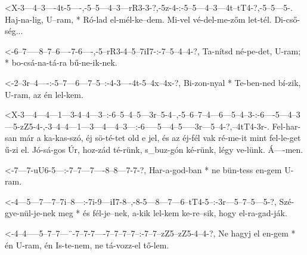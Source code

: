   {<X-3---4--3----4t-5----,-5--5---4--3---rR3-3-?,-5z-4-:-5--5---4--3---4t--tT4-?,-5--5---5-.}
  {   Haj-na-lig, U--ram, * Ró-lad el-mél-ke--dem. Mi-vel vé-del-me-zőm let-tél.   Di-cső-ség...}

  {<-6--7-----8--7--6----7-6----,-5--rR3-4--5--7iI7-:-7--5--4--4-?,}
  {  Ta-nítsd né-pe-det, U-ram; * bo-csá-na-tá-ra     bű-ne-ik-nek.}


  {<-2--3r--4----:-5--7---6---7--5--:-4-3----4t-5--4x--4x-?,}
  {  Bi-zon-nyal * Te-ben-ned bí-zik, U-ram, az én lel-kem.}



  {<X-3---4---4---1---3-4--4---3--:-6--5--4--5---3r--5-4--,-5--6--7--4---6---5--4--3-:-6----5---4--3---5-zZ5-4-,-3--4--4---1---3---4---4--3---:-6-----5---4--5-----3r---5--4-?,--4tT4-3r-.}
  {   Fel-har-san már a ka-kas-szó, éj sö-té-tet old e jel, és az éj-fél vak ré-me-it  mint fel-le-get ű-zi  el. Jó-sá-gos Úr, hoz-zád té-rünk, s_buz-gón ké-rünk, légy ve-lünk. Á----men.}

  {<-7---7-uU6-5---:-7--7---7----8--8---7-7-?,}
  {  Har-a-god-ban * ne bün-tess en-gem U-ram.}

  {<-4---5---7---7--7i--8---:-7i-9---iI7-8--,-8-5---8---7---6--tT4-5--:-3r---5--7--5---5-?,}
  {  Szé-gye-nül-je-nek meg * és fél-je--nek, a-kik lel-kem ke-re--sik, hogy el-ra-gad-ják.}

  {<-4--4-----5--7--7---¨-7--7-7----7--7--7--7--:-7--7--zZ5--zZ5-4--4-?,}
  {  Ne hagyj el en-gem * én U-ram, én Is-te-nem, ne tá-vozz-el  tő-lem.}



